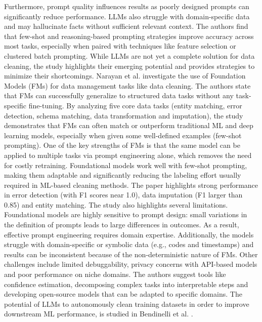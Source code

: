 Furthermore, prompt quality influences results as poorly designed prompts can significantly reduce performance. 
LLMs also struggle with domain-specific data and may hallucinate facts without sufficient relevant context. 
The authors find that few-shot and reasoning-based prompting strategies improve accuracy across most tasks, especially when paired with techniques like feature selection or clustered batch prompting. 
While LLMs are not yet a complete solution for data cleaning, the study highlights their emerging potential and provides strategies to minimize their shortcomings.
\newline\newline
Narayan et al. \cite{FMDATACLEANING} investigate the use of Foundation Models (FMs) for data management tasks like data cleaning. 
The authors state that FMs can successfully generalize to structured data tasks without any task-specific fine-tuning. 
By analyzing five core data tasks (entity matching, error detection, schema matching, data transformation and imputation), the study demonstrates that FMs can often match or outperform traditional ML and deep learning models, especially when given some well-defined examples (few-shot prompting). 
One of the key strengths of FMs is that the same model can be applied to multiple tasks via prompt engineering alone, which removes the need for costly retraining. 
Foundational models work well with few-shot prompting, making them adaptable and significantly reducing the labeling effort usually required in ML-based cleaning methods. 
The paper highlights strong performance in error detection (with F1 scores near 1.0), data imputation (F1 larger than 0.85) and entity matching. 
The study also highlights several limitations. 
Foundational models are highly sensitive to prompt design: small variations in the definition of prompts leads to large differences in outcomes. 
As a result, effective prompt engineering requires domain expertise. 
Additionally, the models struggle with domain-specific or symbolic data (e.g., codes and timestamps) and results can be inconsistent because of the non-deterministic nature of FMs. 
Other challenges include limited debuggability, privacy concerns with API-based models and poor performance on niche domains. 
The authors suggest tools like confidence estimation, decomposing complex tasks into interpretable steps and developing open-source models that can be adapted to specific domains. 
\newline\newline
The potential of LLMs to autonomously clean training datasets in order to improve downstream ML performance, is studied in Bendinelli et al. \cite{EXPLORINGLLMS}. 
